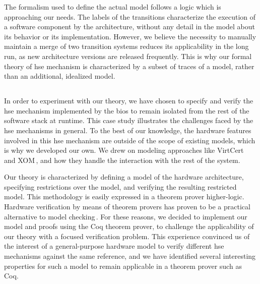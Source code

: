 %
The formalism used to define the actual model follows a logic which is
approaching our needs.
%
The labels of the transitions characterize the execution of a software component
by the architecture, without any detail in the model about its behavior or its
implementation.
%
However, we believe the necessity to manually maintain a merge of two transition
systems reduces its applicability in the long run, as new architecture versions
are released frequently.
%
This is why our formal theory of \ac{hse} mechanism is characterized by a subset
of traces of a model, rather than an additional, idealized model.
%

\subsection*{}

In order to experiment with our theory, we have chosen to specify and verify the
\ac{hse} mechanism implemented by the \ac{bios} to remain isolated from the rest
of the software stack at runtime.
%
This case study illustrates the challenges faced by the \ac{hse} mechanisms in
general.
%
To the best of our knowledge, the hardware features involved in this \ac{hse}
mechanism are outside of the scope of existing models, which is why we developed
our own.
%
We drew on modeling approaches like VirtCert\,\cite{barthe2011virtcert1} and
XOM\,\cite{lie2003xom}, and how they handle the interaction with the rest of the
system.

Our theory is characterized by defining a model of the hardware architecture,
specifying restrictions over the model, and verifying the resulting restricted
model.
%
This methodology is easily expressed in a theorem prover higher-logic.
%
Hardware verification by means of theorem provers has proven to be a practical
alternative to model checking\,\cite{vijayaraghavan2015modular,choi2017kami}.
%
For these reasons, we decided to implement our model and proofs using the Coq
theorem prover, to challenge the applicability of our theory with a focused
verification problem.
%
This experience convinced us of the interest of a general-purpose hardware model
to verify different \ac{hse} mechanisms against the same reference, and we have
identified several interesting properties for such a model to remain applicable
in a theorem prover such as Coq.

